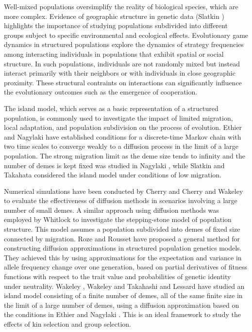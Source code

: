 \documentclass[11pt]{article}
\begin{document}
Well-mixed populations oversimplify the reality of biological species, which are more complex. Evidence of geographic structure in genetic data (Slatkin \cite{S1985}) highlights the importance of studying populations subdivided into different groups subject to specific environmental and ecological effects.  Evolutionary game dynamics in structured populations explore the dynamics of strategy frequencies among interacting individuals in populations that exhibit spatial or social structure. In such populations, individuals are not randomly mixed but instead interact primarily with their neighbors or with individuals in close geographic proximity. These structural contraints on interactions can significantly influence the evolutionary outcomes such as the emergence of cooperation.

The island model, which serves as a basic representation of a structured population, is commonly used to investigate the impact of limited migration, local adaptation, and population subdivision on the process of evolution. Ethier and Nagylaki \cite{EN1980} have established conditions for a discrete-time Markov chain with two time scales to converge weakly to a diffusion process in the limit of a large population. The strong migration limit as the deme size tends to infinity and the number of demes is kept fixed was studied in
Nagylaki \cite{N1980, N1982, N2000}, while Slatkin \cite{S1981} and Takahata \cite{T1991} considered the island model under conditions of low migration. 


Numerical simulations have been conducted by Cherry \cite{C2003a,C2003b} and Cherry and Wakeley \cite{CW2003} to evaluate the effectiveness of diffusion methods in scenarios involving a large number of small demes. A similar approach using diffusion methods was employed by Whitlock \cite{W2003} to investigate the stepping-stone model of population structure. This model assumes a population subdivided into demes of fixed size connected by migration. Roze and Rousset \cite{RR2003} have proposed a general method for constructing diffusion approximations in structured population genetics models. They achieved this by using approximations for the expectation and variance in allele frequency change over one generation, based on partial derivatives of fitness functions with respect to the trait value and probabilities of genetic identity under neutrality. Wakeley \cite{W2003}, Wakeley and Takahashi \cite{WT2004}  and Lessard \cite{L2009} have studied an island model consisting of a finite number of demes, all of the same finite size in the limit of a large number of demes, using a diffusion approximation based on the conditions in Ethier and Nagylaki \cite{EN1980}. This is an ideal framework to study the effects of kin selection and group selection.
\end{document}
